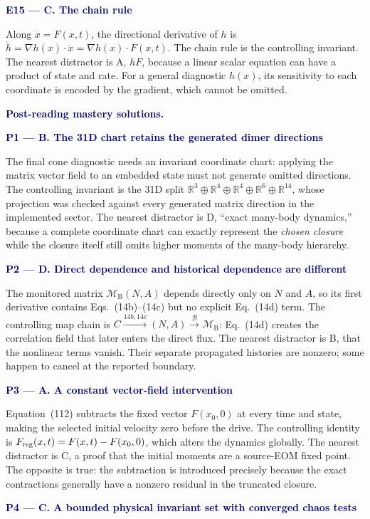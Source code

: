 \documentclass[10pt]{article}
\newcommand{\R}{\mathbb R}
\newcommand{\MB}{\mathcal M_{\mathrm B}}
\newcommand{\LB}{\mathcal B}
\newcommand{\flowlead}[1]{%
  \par\medskip
  \needspace{3\baselineskip}%
  \noindent\textcolor{navy}{\textbf{#1.}}\enspace\ignorespaces
}
\newcommand{\qhead}[2]{%
  \needspace{8\baselineskip}
  \par\medskip\noindent\textcolor{navy}{\textbf{#1. #2}}\par
}
\begin{document}
\qhead{E15 --- C}{The chain rule}

Along \(\dot x=F(x,t)\), the directional derivative of \(h\) is
\(\dot h=\nabla h(x)\cdot\dot x=\nabla h(x)\cdot F(x,t)\).  The chain rule is
the controlling invariant.  The nearest distractor is A, \(hF\), because a
linear scalar equation can have a product of state and rate.  For a general
diagnostic \(h(x)\), its sensitivity to each coordinate is encoded by the
gradient, which cannot be omitted.

\clearpage
\flowlead{Post-reading mastery solutions}

\qhead{P1 --- B}{The 31D chart retains the generated dimer directions}

The final cone diagnostic needs an invariant coordinate chart: applying the
matrix vector field to an embedded state must not generate omitted directions.
The controlling invariant is the 31D split
\(\R^3\oplus\R^4\oplus\R^4\oplus\R^6\oplus\R^{14}\), whose projection was
checked against every generated matrix direction in the implemented sector.
The nearest distractor is D, ``exact many-body dynamics,'' because a complete
coordinate chart can exactly represent the \emph{chosen closure} while the
closure itself still omits higher moments of the many-body hierarchy.

\qhead{P2 --- D}{Direct dependence and historical dependence are different}

The monitored matrix \(\MB(N,A)\) depends directly only on \(N\) and \(A\),
so its first derivative contains Eqs.~(14b)--(14c) but no explicit
Eq.~(14d) term.  The controlling map chain is
\(C\xrightarrow{14b,14c}(N,A)\xrightarrow{\LB}\MB\): Eq.~(14d) creates the
correlation field that later enters the direct flux.  The nearest distractor
is B, that the nonlinear terms vanish.  Their separate propagated histories
are nonzero; some happen to cancel at the reported boundary.

\qhead{P3 --- A}{A constant vector-field intervention}

Equation~(112) subtracts the fixed vector \(F(x_0,0)\) at every time and
state, making the selected initial velocity zero before the drive.  The
controlling identity is
\(F_{\rm reg}(x,t)=F(x,t)-F(x_0,0)\), which alters the dynamics globally.
The nearest distractor is C, a proof that the initial moments are a source-EOM
fixed point.  The opposite is true: the subtraction is introduced precisely
because the exact contractions generally have a nonzero residual in the
truncated closure.

\qhead{P4 --- C}{A bounded physical invariant set with converged chaos tests}
\end{document}
